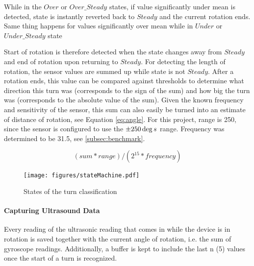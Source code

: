 While in the $Over$ or $Over\_Steady$ states, if value significantly under mean is detected, state is instantly reverted back to $Steady$ and the current rotation ends. Same thing happens for values significantly over mean while in $Under$ or $Under\_Steady$ state

Start of rotation is therefore detected when the state changes away from $Steady$ and end of rotation upon returning to $Steady$.
For detecting the length of rotation, the sensor values are summed up while state is not $Steady$.
After a rotation ends, this value can be compared against thresholds to determine what direction this turn was (corresponds to the sign of the sum) and how big the turn was (corresponds to the absolute value of the sum).
Given the known frequency and sensitivity of the sensor, this sum can also easily be turned into an estimate of distance of rotation, see Equation \ref{eq:angle}. For this project, range is 250, since the sensor is configured to use the $\pm250\deg\\s$ range. Frequency was determined to be 31.5, see \ref{subsec:benchmark}.

\begin{equation}
    (sum * range) / (2 ^{15}  * frequency)
    \label{eq:angle}
\end{equation}

\begin{figure}
    \centering
    \texttt{[image: figures/stateMachine.pdf]}
    \caption{States of the turn classification}

    \label{fig:stateMachine}
\end{figure}

\paragraph{Capturing Ultrasound Data}
Every reading of the ultrasonic reading that comes in while the device is in rotation is saved together with the current angle of rotation, i.e. the sum of gyroscope readings. Additionally, a buffer is kept to include the last n (5) values once the start of a turn is recognized.

